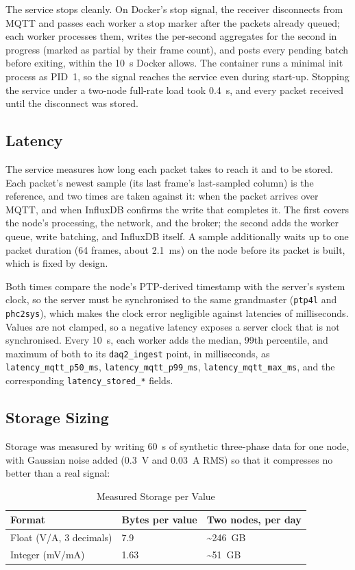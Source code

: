 The service stops cleanly. On Docker's stop signal, the receiver disconnects from MQTT and passes each worker a stop marker after the packets already queued; each worker processes them, writes the per-second aggregates for the second in progress (marked as partial by their frame count), and posts every pending batch before exiting, within the 10~s Docker allows. The container runs a minimal init process as PID~1, so the signal reaches the service even during start-up. Stopping the service under a two-node full-rate load took 0.4~s, and every packet received until the disconnect was stored.

\subsection{Latency}
The service measures how long each packet takes to reach it and to be stored. Each packet's newest sample (its last frame's last-sampled column) is the reference, and two times are taken against it: when the packet arrives over MQTT, and when InfluxDB confirms the write that completes it. The first covers the node's processing, the network, and the broker; the second adds the worker queue, write batching, and InfluxDB itself. A sample additionally waits up to one packet duration (64 frames, about 2.1~ms) on the node before its packet is built, which is fixed by design.

Both times compare the node's PTP-derived timestamp with the server's system clock, so the server must be synchronised to the same grandmaster (\texttt{ptp4l} and \texttt{phc2sys}), which makes the clock error negligible against latencies of milliseconds. Values are not clamped, so a negative latency exposes a server clock that is not synchronised. Every 10~s, each worker adds the median, 99th percentile, and maximum of both to its \texttt{daq2\_ingest} point, in milliseconds, as \texttt{latency\_mqtt\_p50\_ms}, \texttt{latency\_mqtt\_p99\_ms}, \texttt{latency\_mqtt\_max\_ms}, and the corresponding \texttt{latency\_stored\_*} fields.

\subsection{Storage Sizing}
\label{sec:sizing}
Storage was measured by writing 60~s of synthetic three-phase data for one node, with Gaussian noise added (0.3~V and 0.03~A RMS) so that it compresses no better than a real signal:

\begin{table}[H]
\centering
\caption{Measured Storage per Value}
\begin{tabular}{lll}
\hline
\textbf{Format} & \textbf{Bytes per value} & \textbf{Two nodes, per day} \\
\hline
Float (V/A, 3 decimals) & 7.9 & \textasciitilde 246~GB \\
Integer (mV/mA) & 1.63 & \textasciitilde 51~GB \\
\hline
\end{tabular}
\end{table}


